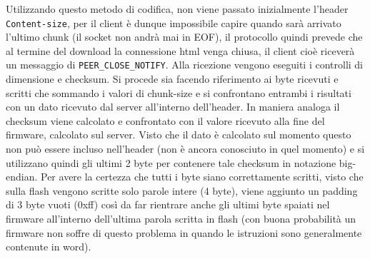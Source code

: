 Utilizzando questo metodo di codifica, non viene passato inizialmente l'header \texttt{Content-size}, per il client \`e dunque impossibile capire quando sar\`a arrivato l'ultimo chunk (il socket non andr\`a mai in EOF), il protocollo quindi prevede che al termine del download la connessione html venga chiusa, il client cio\`e ricever\`a un messaggio di \texttt{PEER\_CLOSE\_NOTIFY}. Alla ricezione vengono eseguiti i controlli di dimensione e checksum. Si procede sia facendo riferimento ai byte ricevuti e scritti che sommando i valori di chunk-size e si confrontano entrambi i risultati con un dato ricevuto dal server all'interno dell'header. In maniera analoga il checksum viene calcolato e confrontato con il valore ricevuto alla fine del firmware, calcolato sul server. Visto che il dato \`e calcolato sul momento questo non pu\`o essere incluso nell'header (non \`e ancora conosciuto in quel momento) e si utilizzano quindi gli ultimi 2 byte per contenere tale checksum in notazione big-endian. Per avere la certezza che tutti i byte siano correttamente scritti, visto che sulla flash vengono scritte solo parole intere (4 byte), viene aggiunto un padding di 3 byte vuoti (0xff) cos\`i da far rientrare anche gli ultimi byte spaiati nel firmware all'interno dell'ultima parola scritta in flash (con buona probabilit\`a un firmware non soffre di questo problema in quando le istruzioni sono generalmente contenute in word).

